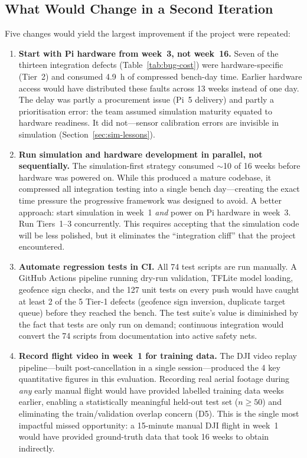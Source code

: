 \subsection{What Would Change in a Second Iteration}\label{app:what-would-change}

Five changes would yield the largest improvement if the project were repeated:

\begin{enumerate}
    \item \textbf{Start with Pi hardware from week~3, not week~16.} Seven of the thirteen integration defects (Table~\ref{tab:bug-cost}) were hardware-specific (Tier~2) and consumed \SI{4.9}{\hour} of compressed bench-day time. Earlier hardware access would have distributed these faults across 13 weeks instead of one day. The delay was partly a procurement issue (Pi~5 delivery) and partly a prioritisation error: the team assumed simulation maturity equated to hardware readiness. It did not---sensor calibration errors are invisible in simulation (Section~\ref{sec:sim-lessons}).

    \item \textbf{Run simulation and hardware development in parallel, not sequentially.} The simulation-first strategy consumed ${\sim}$10 of 16 weeks before hardware was powered on. While this produced a mature codebase, it compressed all integration testing into a single bench day---creating the exact time pressure the progressive framework was designed to avoid. A better approach: start simulation in week~1 \emph{and} power on Pi hardware in week~3. Run Tiers~1--3 concurrently. This requires accepting that the simulation code will be less polished, but it eliminates the ``integration cliff'' that the project encountered.

    \item \textbf{Automate regression tests in CI.} All 74 test scripts are run manually. A GitHub Actions pipeline running dry-run validation, TFLite model loading, geofence sign checks, and the 127 unit tests on every push would have caught at least 2 of the 5 Tier-1 defects (geofence sign inversion, duplicate target queue) before they reached the bench. The test suite's value is diminished by the fact that tests are only run on demand; continuous integration would convert the 74 scripts from documentation into active safety nets.

    \item \textbf{Record flight video in week~1 for training data.} The DJI video replay pipeline---built post-cancellation in a single session---produced the 4 key quantitative figures in this evaluation. Recording real aerial footage during \emph{any} early manual flight would have provided labelled training data weeks earlier, enabling a statistically meaningful held-out test set ($n \geq 50$) and eliminating the train/validation overlap concern (D5). This is the single most impactful missed opportunity: a 15-minute manual DJI flight in week~1 would have provided ground-truth data that took 16 weeks to obtain indirectly.


\end{enumerate}
